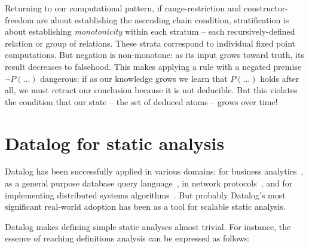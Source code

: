 Returning to our computational pattern, if range-restriction and
constructor-freedom are about establishing the ascending chain condition,
stratification is about establishing \emph{monotonicity} within each stratum --
each recursively-defined relation or group of relations.
%
These strata correspond to individual fixed point computations.
%
But negation is non-monotone: as its input grows toward truth, its result
decreases to falsehood.
%
This makes applying a rule with a negated premise $\neg P(...)$ dangerous: if as
our knowledge grows we learn that $P(...)$ holds after all, we must retract our
conclusion because it is not deducible.
%
But this violates the condition that our state -- the set of deduced atoms -- grows over time!




\section{Datalog for static analysis}
\label{datalog-for-static-analysis}



Datalog has been successfully applied in various domains: for business analytics~\citep{logicblox}, as a general purpose database query language~\citep{datomic}, in network protocols~\citep{DBLP:journals/cacm/LooCGGHMRRS09,dedalus}, and for implementing distributed systems algorithms~\citep{bloom,DBLP:conf/cloud/ConwayMAHM12}.
%
But probably Datalog's most significant real-world adoption has been as a tool for scalable static analysis.

Datalog makes defining simple static analyses almost trivial. For instance, the
essence of reaching definitions analysis can be expressed as follows:

